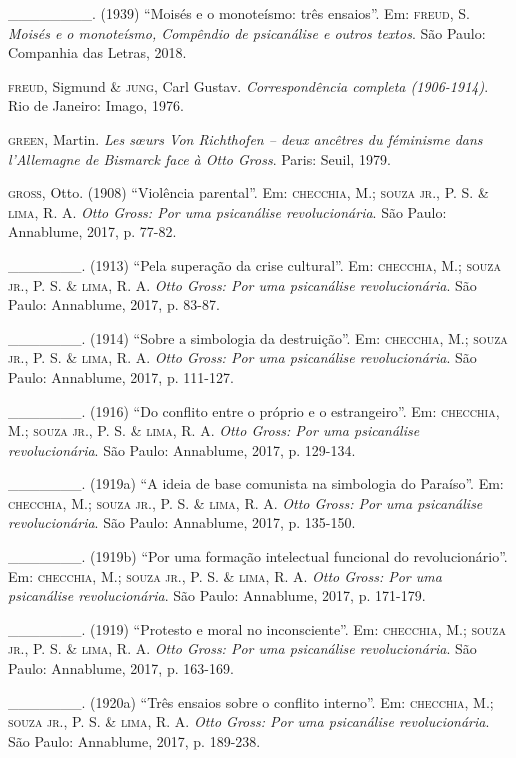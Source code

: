 \begin{Parskip}
\_\_\_\_\_\_\_\_. (1939) ``Moisés e o monoteísmo: três ensaios''. Em: \textsc{freud}, S. \emph{Moisés e o monoteísmo, Compêndio de psicanálise e outros textos}. São Paulo: Companhia das Letras, 2018.

\textsc{freud}, Sigmund \& \textsc{jung}, Carl Gustav. \emph{Correspondência completa (1906-1914)}. Rio de Janeiro: Imago, 1976.

\textsc{green}, Martin. \emph{Les s\oe urs Von Richthofen -- deux ancêtres du féminisme dans l'Allemagne de Bismarck face à Otto Gross}. Paris: Seuil, 1979.

\textsc{gross}, Otto. (1908) ``Violência parental''. Em: \textsc{checchia}, M.; \textsc{souza jr.}, P. S. \& \textsc{lima}, R. A. \emph{Otto Gross: Por uma psicanálise revolucionária}. São Paulo: Annablume, 2017, p. 77-82.

\_\_\_\_\_\_\_. (1913) ``Pela superação da crise cultural''. Em: \textsc{checchia}, M.; \textsc{souza jr.}, P. S. \& \textsc{lima}, R. A. \emph{Otto Gross: Por uma psicanálise revolucionária}. São Paulo: Annablume, 2017, p. 83-87.

\_\_\_\_\_\_\_. (1914) ``Sobre a simbologia da destruição''. Em: \textsc{checchia}, M.; \textsc{souza jr.}, P. S. \& \textsc{lima}, R. A. \emph{Otto Gross: Por uma psicanálise revolucionária}. São Paulo: Annablume, 2017, p. 111-127.

\_\_\_\_\_\_\_. (1916) ``Do conflito entre o próprio e o estrangeiro''. Em: \textsc{checchia}, M.; \textsc{souza jr.}, P. S. \& \textsc{lima}, R. A. \emph{Otto Gross: Por uma psicanálise revolucionária}. São Paulo: Annablume, 2017, p. 129-134.

\_\_\_\_\_\_\_. (1919a) ``A ideia de base comunista na simbologia do Paraíso''. Em: \textsc{checchia}, M.; \textsc{souza jr.}, P. S. \& \textsc{lima}, R. A. \emph{Otto Gross: Por uma psicanálise revolucionária}. São Paulo: Annablume, 2017, p. 135-150.

\_\_\_\_\_\_\_. (1919b) ``Por uma formação intelectual funcional do revolucionário''. Em: \textsc{checchia}, M.; \textsc{souza jr.}, P. S. \& \textsc{lima}, R. A. \emph{Otto Gross: Por uma psicanálise revolucionária}. São Paulo: Annablume, 2017, p. 171-179.

\_\_\_\_\_\_\_. (1919) ``Protesto e moral no inconsciente''. Em: \textsc{checchia}, M.; \textsc{souza jr.}, P. S. \& \textsc{lima}, R. A. \emph{Otto Gross: Por uma psicanálise revolucionária}. São Paulo: Annablume, 2017, p. 163-169.

\_\_\_\_\_\_\_. (1920a) ``Três ensaios sobre o conflito interno''. Em: \textsc{checchia}, M.; \textsc{souza jr.}, P. S. \& \textsc{lima}, R. A. \emph{Otto Gross: Por uma psicanálise revolucionária}. São Paulo: Annablume, 2017, p. 189-238.


\end{Parskip}
